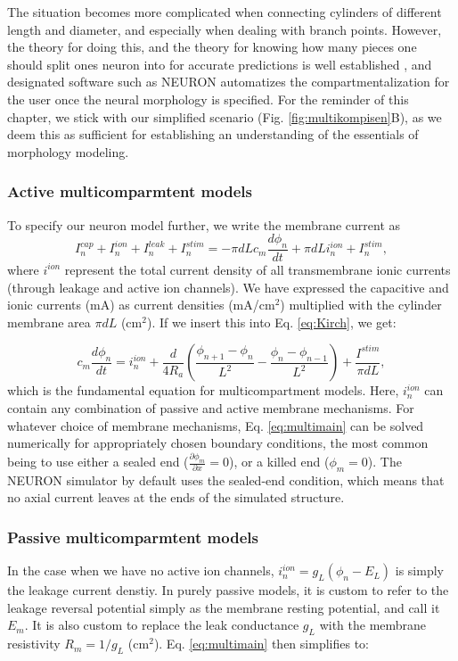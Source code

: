 The situation becomes more complicated when connecting cylinders of different length and diameter, and especially when dealing with branch points. However, the theory for doing this, and the theory for knowing how many pieces one should split ones neuron into for accurate predictions is well established \cite{Rall1977,Rall1989}, and designated software such as NEURON \cite{Hines1997, Hines2009} automatizes the compartmentalization for the user once the neural morphology is specified. For the reminder of this chapter, we stick with our simplified scenario (Fig. \ref{fig:multikompisen}B), as we deem this as sufficient for establishing an understanding of the essentials of morphology modeling. 


\subsubsection{Active multicomparmtent models}
To specify our neuron model further, we write the membrane current as
\begin{equation}
I_n^{cap} + I_n^{ion} + I_n^{leak} + I_n^{stim} = -\pi d L c_m \frac{d\phi_n}{dt} + \pi d L i_n^{ion} + I_n^{stim}, 
\label{eq:Imemb}
\end{equation}
where $i^{ion}$ represent the total current density of all transmembrane ionic currents (through leakage and active ion channels). We have expressed the capacitive and ionic currents (mA) as current densities (mA/cm$^2$) multiplied with the cylinder membrane area $\pi d L$ (cm$^2$). If we insert this into Eq. \ref{eq:Kirch}, we get:


\begin{equation}
c_m \frac{d\phi_n}{dt} = i_n^{ion} + \frac{d}{4R_a}\left(\frac{\phi_{n+1}-\phi_n}{L^2} - \frac{\phi_n-\phi_{n-1}}{L^2} \right) + \frac{I^{stim}}{\pi d L}, 
\label{eq:multimain}
\end{equation}
which is the fundamental equation for multicompartment models. Here,  $i_n^{ion}$ can contain any combination of passive and active membrane mechanisms. For whatever choice of membrane mechanisms, Eq. \ref{eq:multimain} can be solved numerically for appropriately chosen boundary conditions, the most common being to use either a sealed end ($\frac{\partial \phi_m}{\partial x} = 0$), or a killed end ($\phi_m=0$). The NEURON simulator by default uses the sealed-end condition, which means that no axial current leaves at the ends of the simulated structure. 


\subsubsection{Passive multicomparmtent models}
In the case when we have no active ion channels, $i_n^{ion} = g_L(\phi_n - E_L)$ is simply the leakage current denstiy. In purely passive models, it is custom to refer to the leakage reversal potential simply as the membrane resting potential, and call it $E_m$. It is also custom to replace the leak conductance $g_L$ with the membrane resistivity $R_m = 1/g_L$ (\Omega cm$^2$). Eq. \ref{eq:multimain} then simplifies to:

